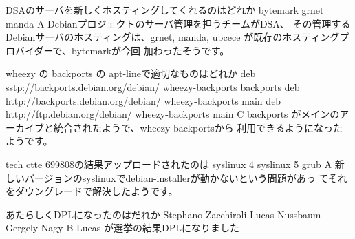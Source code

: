 %

\santaku
{DSAのサーバを新しくホスティングしてくれるのはどれか}
{bytemark}
{grnet}
{manda}
{A}
{Debianプロジェクトのサーバ管理を担うチームがDSA、
その管理するDebianサーバのホスティングは、grnet, manda, ubcece が既存のホスティングプロバイダーで、bytemarkが今回
加わったそうです。}

\santaku
{wheezy の backports の apt-lineで適切なものはどれか}
{deb sstp://backports.debian.org/debian/ wheezy-backports backports}
{deb http://backports.debian.org/debian/ wheezy-backports main}
{deb http://ftp.debian.org/debian/ wheezy-backports main}
{C}
{backports がメインのアーカイブと統合されたようで、wheezy-backportsから
利用できるようになったようです。}

\santaku
{tech ctte 699808の結果アップロードされたのは}
{syslinux 4}
{syslinux 5}
{grub}
{A}
{新しいバージョンのsyslinuxでdebian-installerが動かないという問題があっ
てそれをダウングレードで解決したようです。}

\santaku
{あたらしくDPLになったのはだれか}
{Stephano Zacchiroli}
{Lucas Nussbaum}
{Gergely Nagy}
{B}
{Lucas が選挙の結果DPLになりました}



